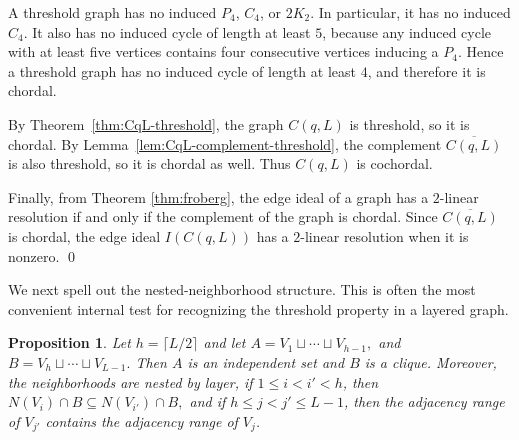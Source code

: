 \documentclass[12pt]{article}
\newtheorem{proposition}[theorem]{Proposition}
\theoremstyle{definition}
\renewenvironment{proof}{{\bf \noindent Proof.}}{\qed}
\begin{document}
\begin{proof}
	A threshold graph has no induced $P_4$, $C_4$, or $2K_2$.  In particular, it has no induced $C_4$.  It also has no induced cycle of length at least $5$, because any induced cycle with at least five vertices contains four consecutive vertices inducing a $P_4$.  Hence a threshold graph has no induced cycle of length at least $4$, and therefore it is chordal.
	
	\medskip
	
	By Theorem~\ref{thm:CqL-threshold}, the graph $C(q,L)$ is threshold, so it is chordal.  By Lemma~\ref{lem:CqL-complement-threshold}, the complement $\overline{C(q,L)}$ is also threshold, so it is chordal as well.  Thus $C(q,L)$ is cochordal.
	
	\medskip
	
	Finally, from Theorem \ref{thm:froberg}, the edge ideal of a graph has a $2$-linear resolution if and only if the complement of the graph is chordal.  Since $\overline{C(q,L)}$ is chordal, the edge ideal $I(C(q,L))$ has a $2$-linear resolution when it is nonzero.
\end{proof}

\medskip


We next spell out the nested-neighborhood structure.  This is often the most convenient internal test for recognizing the threshold property in a layered graph.

\medskip

\begin{proposition}\label{prop:CqL-split-nested}
	Let $h=\lceil L/2\rceil$ and let 
	$ A=V_1\sqcup\cdots\sqcup V_{h-1},$ and $B=V_h\sqcup\cdots\sqcup V_{L-1}. $
	Then $A$ is an independent set and $B$ is a clique.  Moreover, the neighborhoods are nested by layer,  if $1\le i<i'<h$, then
	$ N(V_i)\cap B\subseteq N(V_{i'})\cap B, $
	and if $h\le j<j'\le L-1$, then the adjacency range of $V_{j'}$ contains the adjacency range of $V_j$.
\end{proposition}
\end{document}
